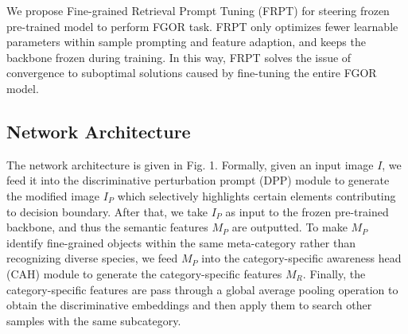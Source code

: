 \documentclass[letterpaper]{article} %
\begin{document}


We propose Fine-grained Retrieval Prompt Tuning (FRPT) for steering frozen pre-trained model to perform FGOR task. FRPT only optimizes fewer learnable parameters within sample prompting and feature adaption, and keeps the backbone frozen during training. In this way, FRPT solves the issue of convergence to suboptimal solutions caused by fine-tuning the entire FGOR model.



\subsection{Network Architecture}
The network architecture is given in Fig. 1.
Formally, given an input image $ I $, we feed it into the discriminative perturbation prompt (DPP) module to generate the modified image $ I_P $ which selectively highlights certain elements contributing to decision boundary. After that, we take $ I_P $ as input to the frozen pre-trained backbone, and thus the semantic features $ M_P $ are outputted.
To make $M_P$ identify fine-grained objects within the same meta-category rather than recognizing diverse species, we feed $ M_P $ into the category-specific awareness head (CAH) module to generate the category-specific features $ M_R $.  Finally, the category-specific features are pass through a global average pooling operation to obtain the discriminative embeddings and then apply them to search other samples with the same subcategory. %



\end{document}

